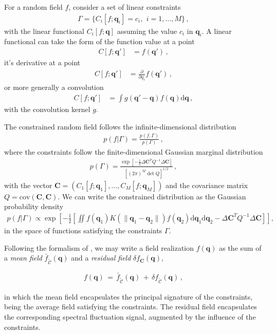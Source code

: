 \documentclass[a4paper, 11pt]{article}
\begin{document}
\bigskip
\noindent For a random field $f$, consider a set of linear constraints
\begin{align}
\Gamma =\{ C_i[f;\bm{q}_i] = c_i,\,\ i=1,\dots,M \}\,,
\end{align}
with the linear functional $C_i[f;\bm{q}]$ assuming the value $c_i$ in $\bm{q}_i$. A linear functional can take the form of the function value at a point
\begin{align}
C[f;\bm{q}'] &= f(\bm{q}')\,,
\end{align}
it's derivative at a point
\begin{align}
C[f;\bm{q}'] &= \frac{\partial}{\partial q_i}f(\bm{q}')\,,
\end{align}
or more generally a convolution
\begin{align}
C[f;\bm{q}'] &= \int g(\bm{q}' - \bm{q})f(\bm{q})\mathrm{d}\bm{q}\,,
\end{align}
with the convolution kernel $g$. 

\bigskip
\noindent The constrained random field follows the infinite-dimensional distribution
\begin{align}
p(f|\Gamma) = \frac{p(f,\Gamma)}{p(\Gamma)}\,,
\end{align}
where the constraints follow the finite-dimensional Gaussian marginal distribution
\begin{align}
p(\Gamma) = \frac{\exp\left[-\frac{1}{2} \Delta\bm{C}^T Q^{-1} \Delta\bm{C} \right]}{[(2\pi)^M \det Q]^{1/2}}\,,
\end{align}
with the vector $\bm{C}=(C_1[f;\bm{q}_1], \dots, C_M[f;\bm{q}_M])$ and the covariance matrix $Q = \text{cov}(\bm{C}, \bm{C})$. We can write the constrained distribution as the Gaussian probability density
\begin{align}
p(f|\Gamma) \propto  \exp\left[-\frac{1}{2} \left[\iint f(\bm{q}_1) K(\|\bm{q}_1 - \bm{q}_2\|) f(\bm{q}_2)\mathrm{d}\bm{q}_1 \mathrm{d}\bm{q}_2 -\Delta \bm{C}^TQ^{-1}\Delta \bm{C}\right]\right],\label{eq:constraint1}
\end{align}
in the space of functions satisfying the constraints $\Gamma$.

\bigskip
Following the formalism of \cite{Bertschinger:1987}, we may write a field realization $f(\bm{q})$ as the sum of a \textit{mean field} $\bar{f}_{\mathcal{\tilde C}}(\bm{q})$ and a \textit{residual field} $\delta f_{\bm{C}}(\bm{q})$,
 \begin{framed}
  \begin{align}
    f(\bm{q})\,=\,\bar{f}_{\mathcal{\tilde C}}(\bm{q})\,+\,\delta f_{\mathcal{\tilde C}}(\bm{q})\,,
  \end{align}
  \end{framed}
\noindent in which the mean field encapsulates the principal signature of the constraints, being the average field satisfying the constraints. The residual field encapsulates the corresponding spectral fluctuation signal, augmented by the influence of the constraints. 
  
\end{document}
